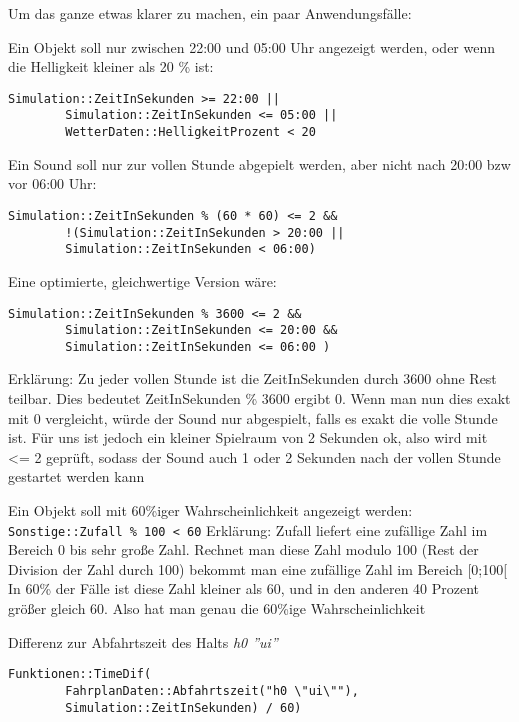 Um das ganze etwas klarer zu machen, ein paar Anwendungsfälle:

Ein Objekt soll nur zwischen 22:00 und 05:00 Uhr angezeigt werden, oder
wenn die Helligkeit kleiner als 20 \% ist:

\begin{lstlisting}
Simulation::ZeitInSekunden >= 22:00 ||
        Simulation::ZeitInSekunden <= 05:00 || 
        WetterDaten::HelligkeitProzent < 20
\end{lstlisting}

Ein Sound soll nur zur vollen Stunde abgepielt werden, aber nicht nach
20:00 bzw vor 06:00 Uhr:

\begin{lstlisting}
Simulation::ZeitInSekunden % (60 * 60) <= 2 &&
        !(Simulation::ZeitInSekunden > 20:00 ||
        Simulation::ZeitInSekunden < 06:00)
\end{lstlisting}

Eine optimierte, gleichwertige Version wäre:

\begin{lstlisting}
Simulation::ZeitInSekunden % 3600 <= 2 &&
        Simulation::ZeitInSekunden <= 20:00 &&
        Simulation::ZeitInSekunden <= 06:00 )
\end{lstlisting}
				
Erklärung: Zu jeder vollen Stunde ist die ZeitInSekunden durch 3600 ohne Rest
teilbar. Dies bedeutet ZeitInSekunden \% 3600 ergibt 0. Wenn man nun
dies exakt mit 0 vergleicht, würde der Sound nur abgespielt, falls es
exakt die volle Stunde ist. Für uns ist jedoch ein kleiner Spielraum von
2 Sekunden ok, also wird mit \textless{}= 2 geprüft, sodass der Sound
auch 1 oder 2 Sekunden nach der vollen Stunde gestartet werden kann

Ein Objekt soll mit 60\%iger Wahrscheinlichkeit angezeigt werden:
\texttt{Sonstige::Zufall \% 100 \textless{} 60} Erklärung: Zufall
liefert eine zufällige Zahl im Bereich 0 bis sehr große Zahl. Rechnet
man diese Zahl modulo 100 (Rest der Division der Zahl durch 100) bekommt
man eine zufällige Zahl im Bereich {[}0;100{[} In 60\% der Fälle ist
diese Zahl kleiner als 60, und in den anderen 40 Prozent größer gleich
60. Also hat man genau die 60\%ige Wahrscheinlichkeit

Differenz zur Abfahrtszeit des Halts \emph{h0 ''ui''}

\begin{lstlisting}
Funktionen::TimeDif( 
        FahrplanDaten::Abfahrtszeit("h0 \"ui\""), 
        Simulation::ZeitInSekunden) / 60)
\end{lstlisting}

